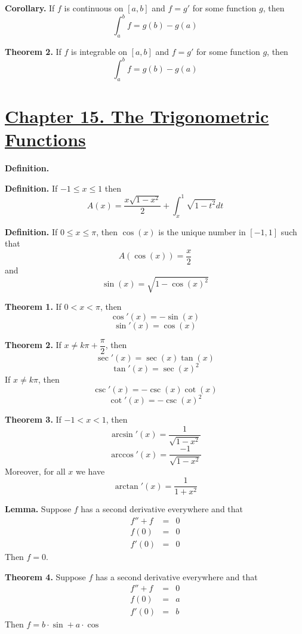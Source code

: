 \documentclass[10pt,letterpaper]{article}
\begin{document}
	\textbf{Corollary. } If $f$ is continuous on $[a, b]$ and $f = g'$ for some function $g$,
	then 
	$$\displaystyle\int_{a}^{b} f = g(b) - g(a)$$	
	
	\textbf{Theorem 2. } If $f$ is integrable on $[a, b]$ and $f = g'$ for some function $g$,
	then 
	$$\displaystyle\int_{a}^{b} f = g(b) - g(a)$$

	\section*{{\color{red}\underline{Chapter 15. The Trigonometric Functions}}}
	\textbf{Definition. }
	
	\textbf{Definition. } 
	If $-1 \leq x \leq 1$ then 
	$$A(x) = \dfrac{x\sqrt{1 - x^2}}{2} + \displaystyle\int_{x}^{1} \sqrt{1 - t^2} dt$$
	
	\textbf{Definition. } 
	If $0 \leq x \leq \pi$, then $\cos(x)$ is the unique number in $[-1, 1]$ such that
	$$A(\cos(x)) = \dfrac{x}{2}$$
	and 
	$$\sin(x) = \sqrt{1 - \cos(x)^2}$$
	
	\textbf{Theorem 1. } If $0 < x < \pi$, then 
	$$\cos'(x) = -\sin(x)$$
	$$\sin'(x) = \cos(x)$$
	
	\textbf{Theorem 2. } If $x \neq k \pi + \dfrac{\pi}{2}$, then 
	$$\sec'(x) = \sec(x) \tan(x)$$
	$$\tan'(x) = \sec(x)^2$$
	If $x \neq k \pi$, then
	$$\csc'(x) = -\csc(x) \cot(x)$$
	$$\cot'(x) = -\csc(x)^2$$
	
	\textbf{Theorem 3. } If $-1 < x < 1$, then
	$$\arcsin'(x) = \dfrac{1}{\sqrt{1 - x^2}}$$
	$$\arccos'(x) = \dfrac{-1}{\sqrt{1 - x^2}}$$
	Moreover, for all $x$ we have
	$$\arctan'(x) = \dfrac{1}{1 + x^2}$$
	
	\textbf{Lemma. } Suppose $f$ has a second derivative everywhere and that
	\begin{eqnarray*}
		f'' + f &=& 0 \\
		f(0) &=& 0 \\
		f'(0) &=& 0 
	\end{eqnarray*}		
	Then $f = 0$.
	
	
	\textbf{Theorem 4. } Suppose $f$ has a second derivative everywhere and that
	\begin{eqnarray*}
		f'' + f &=& 0 \\
		f(0) &=& a \\
		f'(0) &=& b 
	\end{eqnarray*}		
	Then $f = b \cdot \sin + a \cdot \cos$
	
\end{document}
